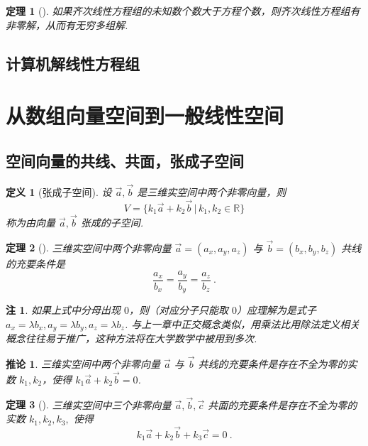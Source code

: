 \documentclass[zihao=-4,UTF8,linespread=1.8,nothm]{aytony_base}
\newtheorem{theorem}{\indent 定理}[subsection]
\newtheorem*{corollary}{\indent 推论}
\newtheorem{definition}{\indent 定义}[subsection]
\newtheorem*{remark}{\indent 注}
\begin{document}
\begin{theorem}[]
    如果齐次线性方程组的未知数个数大于方程个数，则齐次线性方程组有非零解，从而有无穷多组解.
\end{theorem}

\subsection{计算机解线性方程组}

\section{从数组向量空间到一般线性空间}

\subsection{空间向量的共线、共面，张成子空间}

\begin{definition}[张成子空间]
    设 $\vec{a}, \vec{b}$ 是三维实空间中两个非零向量，则 $$
        V = \{k_1 \vec{a} + k_2 \vec{b}\,|\, k_1, k_2 \in \mathbb{R}\}
    $$ 称为由向量 $\vec{a}, \vec{b}$ 张成的子空间.
\end{definition}

\begin{theorem}[]
    三维实空间中两个非零向量 $\vec{a} = (a_x, a_y, a_z)$ 与 $\vec{b}= (b_x, b_y, b_z)$ 共线的充要条件是 $$
        \dfrac{a_x}{b_x} = \dfrac{a_y}{b_y} = \dfrac{a_z}{b_z}\ .
    $$
\end{theorem}

\begin{remark}
    如果上式中分母出现 $0$，则（对应分子只能取 $0$）应理解为是式子 $a_x = \lambda b_x,a_y = \lambda b_y, a_z = \lambda b_z$. 与上一章中正交概念类似，用乘法比用除法定义相关概念往往易于推广，这种方法将在大学数学中被用到多次.
\end{remark}

\begin{corollary}
    三维实空间中两个非零向量 $\vec{a}$ 与 $\vec{b}$ 共线的充要条件是存在不全为零的实数 $k_1, k_2$，使得 $k_1\vec{a} + k_2 \vec{b} = 0$.
\end{corollary}

\begin{theorem}[]
    三维实空间中三个非零向量 $\vec{a},\vec{b},\!\vec{c}$ 共面的充要条件是存在不全为零的实数 $k_1\!,\!k_2,\!k_3,$ 使得 $$
        k_1 \vec{a} + k_2 \vec{b} + k_3 \vec{c} = 0\ .
    $$
\end{theorem}
\end{document}
